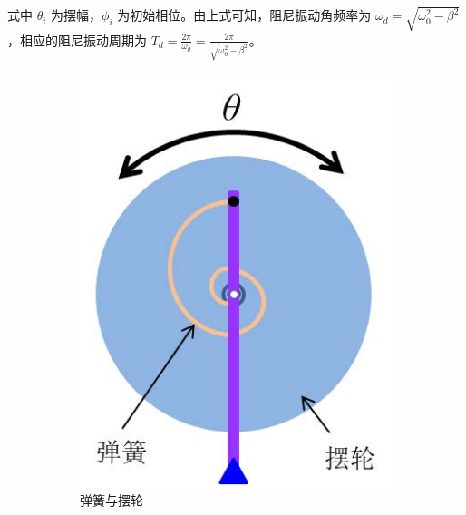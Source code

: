 \documentclass[12pt,a4paper]{amsart}
\begin{document}
式中 $\theta_i$ 为摆幅，$\phi_i$ 为初始相位。由上式可知，阻尼振动角频率为 $\omega_d = \sqrt{\omega_0^2 - \beta^2}$，相应的阻尼振动周期为 $T_d = \frac{2\pi}{\omega_d} = \frac{2\pi}{\sqrt{\omega_0^2 - \beta^2}}$。

\begin{figure}[H]
	\centering
	\begin{subfigure}[b]{0.2475\linewidth}
		\centering
		\includegraphics[width=\linewidth]{img/1.jpg}
		\caption{弹簧与摆轮}
		\label{fig:1}
	\end{subfigure}
	\hfill
	\begin{subfigure}[b]{0.2475\linewidth}
		\centering

\end{subfigure}
\end{figure}
\end{document}
